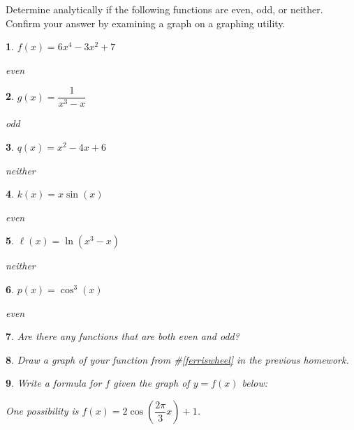 \documentclass{amsbook}
\newtheorem{exc}{}
\newenvironment{ex}{\begin{exc}\normalfont}{\end{exc}}
\numberwithin{section}{chapter}
\numberwithin{equation}{chapter}
\newcommand{\drawgridxxyy}[4]{
	\draw[thin, color=lightgray] (#1,#3) grid (#2,#4);
	\draw[thick,->] (#1,0) -- (#2,0) node[right] {$x$}; 
	\draw[thick, ->] (0,#3) -- (0,#4) node[above] {$y$};
}
\begin{document}
Determine analytically if the following functions are even, odd, or neither. Confirm your answer by examining a graph on a graphing utility.

\begin{multicols}{2}
	
	\begin{ex}
		$f(x) = 6x^4-3x^2+7$
		\begin{sol}
			even
		\end{sol}
	\end{ex}

	
\begin{ex}
	$g(x) = \dfrac{1}{x^3-x}$
	\begin{sol}
		odd
	\end{sol}
\end{ex}

	
\begin{ex}
	$q(x) = x^2-4x+6$
	\begin{sol}
		neither
	\end{sol}
\end{ex}

	
\begin{ex}
	$k(x) = x\sin(x)$
	\begin{sol}
		even
	\end{sol}
\end{ex}

	
\begin{ex}
	$\ell(x) = \ln(x^3-x)$
	\begin{sol}
		neither
	\end{sol}
\end{ex}

	
\begin{ex}
	$p(x) = \cos^3(x)$
	\begin{sol}
		even
	\end{sol}
\end{ex}
	
\end{multicols}

\begin{ex}
	Are there any functions that are both even and odd?
\end{ex}

\begin{ex}
	Draw a graph of your function from \#\ref{ferriswheel} in the previous homework.
\end{ex}

\begin{ex}
	Write a formula for $f$ given the graph of $y=f(x)$ below:
	
	\begin{sol}
	One possibility is $f(x) = 2\cos\left( \dfrac{2\pi}{3}x \right)+1$.
	\end{sol}
\end{ex}
\end{document}
